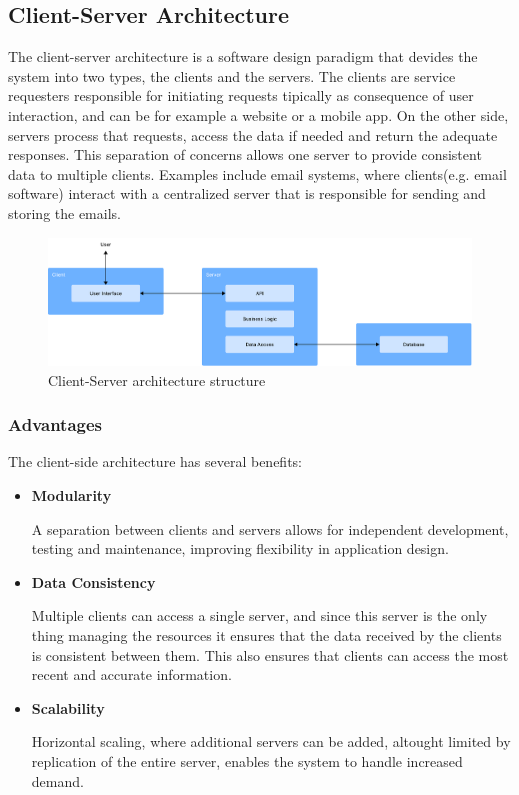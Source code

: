 \subsection{Client-Server Architecture}
The client-server architecture is a software design paradigm that devides the
system into two types, the clients and the servers. The clients are service
requesters responsible for initiating requests tipically as consequence of user
interaction, and can be for example a website or a mobile app. On the other
side, servers process that requests, access the data if needed and return the
adequate responses. This separation of concerns allows one server to provide
consistent data to multiple clients.
Examples include email systems, where clients(e.g. email software) interact with
a centralized server that is responsible for sending and storing the emails\cite{Sulyman}.

\begin{figure}[htbp]
	\centering
	\includegraphics[width=\textwidth, height=0.5\textheight, keepaspectratio]{Chapters/Figures/Architectures/Client-server.pdf}
	\caption{Client-Server architecture structure}
	\label{fig:architectures:client-server}
\end{figure}

\subsubsection{Advantages}
The client-side architecture has several benefits:
\begin{itemize}
	\item \textbf{Modularity}

	      A separation between clients and servers allows for independent development,
	      testing and maintenance, improving flexibility in application design.

	\item \textbf{Data Consistency}

	      Multiple clients can access a single server, and since this server is the
	      only thing managing the resources it ensures that the data received by the
	      clients is consistent between them. This also ensures that clients can access
	      the most recent and accurate information.

	\item \textbf{Scalability}

	      Horizontal scaling, where additional servers can be added, altought limited
	      by replication of the entire server, enables the system to handle increased
	      demand.
\end{itemize}
